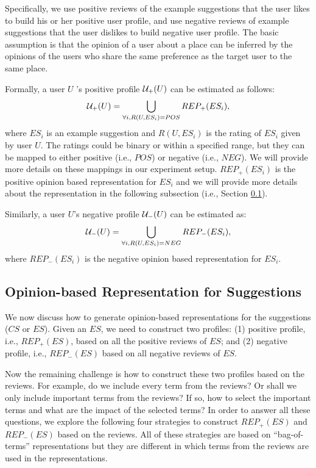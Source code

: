 Specifically, we use positive reviews of the example suggestions that the 
user likes to build his or her positive user profile, and use negative
reviews of example suggestions that the user dislikes to build negative user 
profile. The basic assumption is that the opinion of a user about a place 
can be inferred by the opinions of the users who share the same preference 
as the target user to the same place. 

Formally, a user $U$ 's positive profile ${\cal U}_{+}(U)$ can be 
estimated as follows:  
\begin{eqnarray} 
{\cal U}_{+}(U) = \bigcup_{\forall i, R(U,ES_i)=POS} REP_{+}(ES_i) \label{eqn:userp}, 
\end{eqnarray} 
where $ES_i$ is an example suggestion and $R(U,ES_i)$ is the rating of 
$ES_i$ given by user $U$. The ratings could be binary or within a specified 
range, but they can be mapped to either positive (i.e., $POS$) 
or negative (i.e., $NEG$). We will provide more details on these mappings 
in our experiment setup.  $REP_{+}(ES_i)$ is the positive opinion based 
representation for $ES_i$ and we will provide more details about the 
representation in the following subsection (i.e., Section \ref{sec:repo}). 

Similarly, a user $U$'s negative profile ${\cal U}_{-}(U)$ can be estimated as: 
\begin{eqnarray} 
{\cal U}_{-}(U) =\bigcup_{\forall i, R(U,ES_i)=NEG} REP_{-}(ES_i) \label{eqn:usern}, 
\end{eqnarray} 
where $REP_{-}(ES_i)$ is the negative opinion based representation for $ES_i$. 

\subsection{Opinion-based Representation for Suggestions} 
\label{sec:repo}

We now discuss how to generate opinion-based representations 
for the suggestions ($CS$ or $ES$).  Given an $ES$, we need 
to construct two profiles: (1) positive profile, i.e., $REP_{+}(ES)$,
based on all the positive reviews of $ES$; and (2) negative profile, i.e., 
$REP_{-}(ES)$ based on all negative reviews of $ES$. 

Now the remaining challenge is how to construct these two profiles
based on the reviews. For example, do we include every term 
from the reviews? Or shall we only include important terms from 
the reviews? If so, how to select the important terms and what 
are the impact of the selected terms?  In order to answer 
all these questions, we explore the following four strategies 
to construct $REP_{+}(ES)$ and $REP_{-}(ES)$ based on the reviews. 
All of these strategies are based on ``bag-of-terms'' representations
but they are different in which terms from the reviews are 
used in the representations. 

